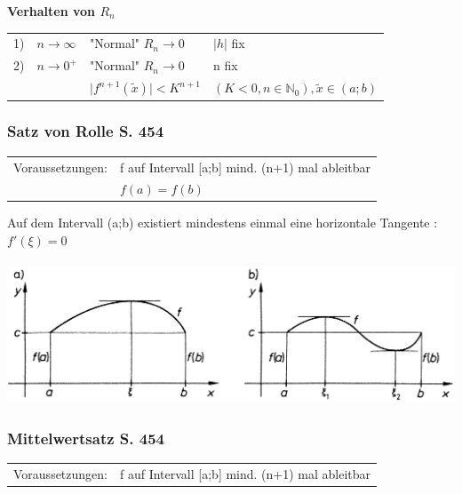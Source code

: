 			
			\textbf{Verhalten von $R_n$}	\\
			
			\begin{tabular}{llll}
			1) & $n \rightarrow \infty$ & "Normal" \quad $R_n \rightarrow 0$ & $\vert h \vert$ fix  \\
			2) & $n \rightarrow 0^+$ & "Normal" \quad $R_n \rightarrow 0$ & n fix \\
			& &  $\vert f^{n+1}(\tilde{x})\vert < K^{n+1}$ & $(K < 0, n \in \mathbb{N}_0), \tilde{x} \in (a;b)$ \\
			\end{tabular}
			
			
			\subsubsection{Satz von Rolle S. 454}
			\begin{tabular}{ll}
			Voraussetzungen: & f auf Intervall [a;b] mind. (n+1) mal ableitbar\\
			 & $f(a) = f(b)$ \\
			\end{tabular}
			
			Auf dem Intervall (a;b) existiert mindestens einmal  eine horizontale Tangente : $f'(\xi) = 0$ \\			
			 \\
			 

			\includegraphics[width=0.9\linewidth]{Bilder/rolle}
			
			
			
			\subsubsection{Mittelwertsatz S. 454}			
			\begin{tabular}{ll}
			Voraussetzungen: &  f auf Intervall [a;b] mind. (n+1) mal ableitbar \\
			\end{tabular}

